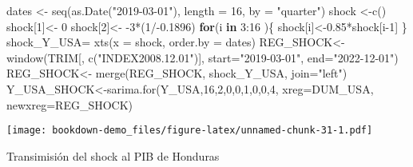 \documentclass[
]{book}
\newenvironment{Shaded}{\begin{snugshade}}{\end{snugshade}}
\newcommand{\AttributeTok}[1]{\textcolor[rgb]{0.77,0.63,0.00}{#1}}
\newcommand{\ControlFlowTok}[1]{\textcolor[rgb]{0.13,0.29,0.53}{\textbf{#1}}}
\newcommand{\DecValTok}[1]{\textcolor[rgb]{0.00,0.00,0.81}{#1}}
\newcommand{\FloatTok}[1]{\textcolor[rgb]{0.00,0.00,0.81}{#1}}
\newcommand{\FunctionTok}[1]{\textcolor[rgb]{0.00,0.00,0.00}{#1}}
\newcommand{\NormalTok}[1]{#1}
\newcommand{\OtherTok}[1]{\textcolor[rgb]{0.56,0.35,0.01}{#1}}
\newcommand{\SpecialCharTok}[1]{\textcolor[rgb]{0.00,0.00,0.00}{#1}}
\newcommand{\StringTok}[1]{\textcolor[rgb]{0.31,0.60,0.02}{#1}}
\begin{document}
\begin{Shaded}
\begin{Highlighting}[]
\NormalTok{dates }\OtherTok{\textless{}{-}} \FunctionTok{seq}\NormalTok{(}\FunctionTok{as.Date}\NormalTok{(}\StringTok{"2019{-}03{-}01"}\NormalTok{), }\AttributeTok{length =} \DecValTok{16}\NormalTok{, }\AttributeTok{by =} \StringTok{"quarter"}\NormalTok{)}
\NormalTok{shock }\OtherTok{\textless{}{-}}\FunctionTok{c}\NormalTok{()}
\NormalTok{shock[}\DecValTok{1}\NormalTok{]}\OtherTok{\textless{}{-}} \DecValTok{0}
\NormalTok{shock[}\DecValTok{2}\NormalTok{]}\OtherTok{\textless{}{-}} \SpecialCharTok{{-}}\DecValTok{3}\SpecialCharTok{*}\NormalTok{(}\DecValTok{1}\SpecialCharTok{/{-}}\FloatTok{0.1896}\NormalTok{)}
\ControlFlowTok{for}\NormalTok{(i }\ControlFlowTok{in} \DecValTok{3}\SpecialCharTok{:}\DecValTok{16}\NormalTok{ )\{}
\NormalTok{  shock[i]}\OtherTok{\textless{}{-}}\FloatTok{0.85}\SpecialCharTok{*}\NormalTok{shock[i}\DecValTok{{-}1}\NormalTok{]}
\NormalTok{\}}
\NormalTok{shock\_Y\_USA}\OtherTok{=} \FunctionTok{xts}\NormalTok{(}\AttributeTok{x =}\NormalTok{ shock, }\AttributeTok{order.by =}\NormalTok{ dates) }
\NormalTok{REG\_SHOCK}\OtherTok{\textless{}{-}}\FunctionTok{window}\NormalTok{(TRIM[, }\FunctionTok{c}\NormalTok{(}\StringTok{"INDEX2008.12.01"}\NormalTok{)], }\AttributeTok{start=}\StringTok{"2019{-}03{-}01"}\NormalTok{, }\AttributeTok{end=}\StringTok{"2022{-}12{-}01"}\NormalTok{)}
\NormalTok{REG\_SHOCK}\OtherTok{\textless{}{-}} \FunctionTok{merge}\NormalTok{(REG\_SHOCK, shock\_Y\_USA, }\AttributeTok{join=}\StringTok{"left"}\NormalTok{)}
\NormalTok{Y\_USA\_SHOCK}\OtherTok{\textless{}{-}}\FunctionTok{sarima.for}\NormalTok{(Y\_USA,}\DecValTok{16}\NormalTok{,}\DecValTok{2}\NormalTok{,}\DecValTok{0}\NormalTok{,}\DecValTok{0}\NormalTok{,}\DecValTok{1}\NormalTok{,}\DecValTok{0}\NormalTok{,}\DecValTok{0}\NormalTok{,}\DecValTok{4}\NormalTok{, }\AttributeTok{xreg=}\NormalTok{DUM\_USA, }\AttributeTok{newxreg=}\NormalTok{REG\_SHOCK) }
\end{Highlighting}
\end{Shaded}

\texttt{[image: bookdown-demo\_files/figure-latex/unnamed-chunk-31-1.pdf]}

Transimisión del shock al PIB de Honduras
\end{document}
